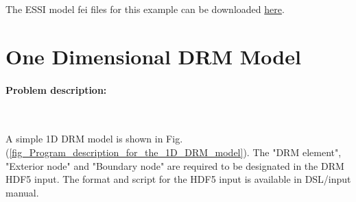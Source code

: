 \documentclass[fleqn,11pt]{article}
\begin{document}
The ESSI model fei files for this example can be downloaded 
\href{https://github.com/BorisJeremic/Real-ESSI-Examples/blob/master/model_fei_file/ANDESshell_square_plate/ANDESshell_square_plate.tgz?raw=true}{here}.

































\section{One Dimensional DRM Model}





\paragraph{Problem description:} ~


A simple 1D DRM model is shown in Fig.(\ref{fig_Program_description_for_the_1D_DRM_model}). 
The "DRM element", "Exterior node" and "Boundary node" are required
to be designated in the DRM HDF5 input. The format and script for the HDF5 input
is available in DSL/input manual.
\end{document}

